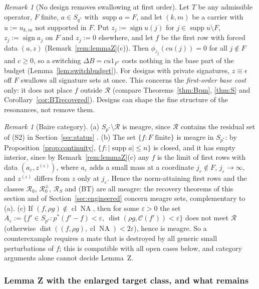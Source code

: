 \documentclass[10pt]{amsart}
\theoremstyle{definition}
\theoremstyle{remark}
\newtheorem{remark}[theorem]{Remark}
\newcommand{\NA}{\operatorname{NA}}
\newcommand{\supp}{\operatorname{supp}}
\newcommand{\sgn}{\operatorname{sign}}
\newcommand{\dist}{\operatorname{dist}}
\newcommand{\Cset}{\mathcal C}
\newcommand{\cl}{\operatorname{cl}}
\newcommand{\Rec}{\mathcal R}
\begin{document}
\begin{remark}[No design removes swallowing at first order]\label{rem:nodesign}
Let $T$ be any admissible operator, $F$ finite, $a\in S_{q^*}$ with
$\supp a=F$, and let $(k,m)$ be a carrier with $u:=u_{k,m}$ not supported
in $F$.  Put $z_j:=\sgn u(j)$ for $j\in\supp u\setminus F$, $z_j:=\sgn a_j$
on $F$ and $z_j:=0$ elsewhere, and let $f$ be the first row with forced
data $(a,z)$ (Remark~\ref{rem:lemmaZ}(c)).  Then $\phi_{z_j}(cu(j))=0$ for
all $j\notin F$ and $c\ge0$, so a switching $\Delta B=cu1_{F^c}$ costs
nothing in the base part of the budget (Lemma~\ref{lem:switchbudget}).  For
designs with private signatures, $z\equiv\epsilon$ off $F$ swallows all
signature sets at once.  This concerns the \emph{first-order base cost}
only: it does not place $f$ outside $\Rec$ (compare
Theorems~\ref{thm:Bpm}, \ref{thm:S} and Corollary~\ref{cor:BTrecovered}).
Designs can shape the fine structure of the resonances, not remove them.
\end{remark}

\begin{remark}[Baire category]\label{rem:meagre}
(a) $S_{p^*}\setminus\Rec$ is meagre, since $\Rec$ contains the residual
set of (S2) in Section~\ref{sec:status} \cite{PrA}.  (b) The set
$\{f:F\text{ finite}\}$ is meagre in $S_{p^*}$: by
Proposition~\ref{prop:continuity}, $\{f:|\supp a|\le n\}$ is closed, and it
has empty interior, since by Remark~\ref{rem:lemmaZ}(c) any $f$ is the
limit of first rows with data $(a_\varepsilon,z^{(\varepsilon)})$, where
$a_\varepsilon$ adds a small mass at a coordinate $j_\varepsilon\notin F$,
$j_\varepsilon\to\infty$, and $z^{(\varepsilon)}$ differs from $z$ only at
$j_\varepsilon$.  Hence the norm-attaining first rows and the classes
$\mathcal R_0$, $\mathcal R_0^\pm$, $\mathcal R_S$ and \textup{(BT)} are
all meagre: the recovery theorems of this section and of
Section~\ref{sec:engineered} concern meagre sets, complementary to (a).
(c) If $(f,\rho g)\notin\cl\NA$, then for some $\varepsilon>0$ the set
$A_\varepsilon:=\{f'\in S_{p^*}:p^*(f'-f)<\varepsilon,\ \dist(\rho g,
\Cset(f'))<\varepsilon\}$ does not meet $\Rec$ (otherwise
$\dist((f,\rho g),\cl\NA)<2\varepsilon$), hence is meagre.  So a
counterexample requires a mate that is destroyed by all generic small
perturbations of $f$; this is compatible with all open cases below, and
category arguments alone cannot decide Lemma~Z.
\end{remark}

\subsubsection*{Lemma Z with the enlarged target class, and what remains}
\end{document}
